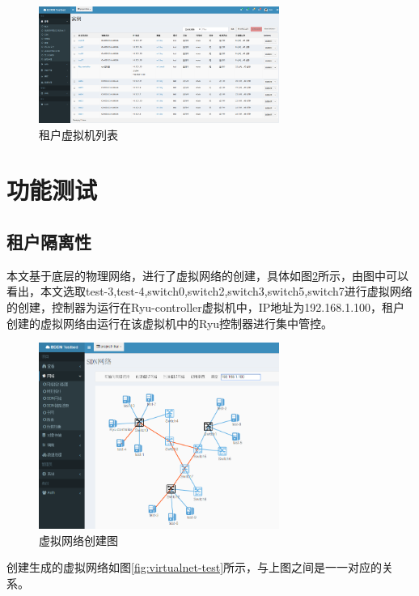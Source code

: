 \begin{figure}[!htb]
  \centering
  \includegraphics[width=0.7\textwidth]{logo/allhosts.png}
  \caption{租户虚拟机列表}
  \label{fig:allhosts}
\end{figure}
\section{功能测试}
\subsection{租户隔离性}
本文基于底层的物理网络，进行了虚拟网络的创建，具体如图\ref{fig:create-virtual}所示，由图中可以看出，本文选取test-3,test-4,switch0,switch2,switch3,switch5,switch7进行虚拟网络的创建，控制器为运行在Ryu-controller虚拟机中，IP地址为192.168.1.100，租户创建的虚拟网络由运行在该虚拟机中的Ryu控制器进行集中管控。

\begin{figure}[!htb]
  \centering
  \includegraphics[width=0.7\textwidth,height=0.50\textwidth]{logo/create-virtual.png}
  \caption{虚拟网络创建图}
  \label{fig:create-virtual}
\end{figure}

创建生成的虚拟网络如图\ref{fig:virtualnet-test}所示，与上图之间是一一对应的关系。

